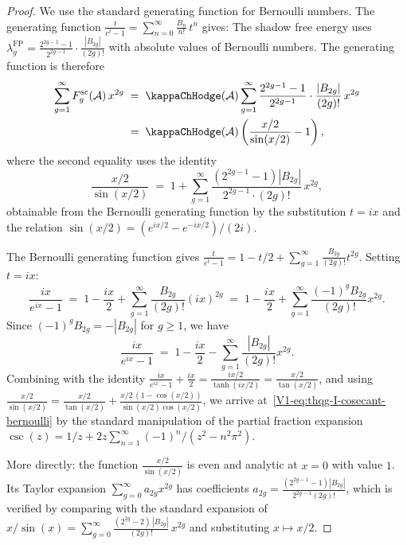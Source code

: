 \begin{proof}
We use the standard generating function for Bernoulli numbers. The generating function $\frac{t}{e^t - 1} = \sum_{n=0}^{\infty} \frac{B_n}{n!}\,t^n$ gives: The shadow free energy uses $\lambda_g^{\mathrm{FP}} = \frac{2^{2g-1}-1}{2^{2g-1}}\cdot\frac{|B_{2g}|}{(2g)!}$ with absolute values of Bernoulli numbers. The generating function is therefore
\begin{align}
\sum_{g=1}^{\infty} F_g^{\mathrm{sc}}(\cA)\,x^{2g} &\;=\; \kappaChHodge(\cA) \sum_{g=1}^{\infty} \frac{2^{2g-1}-1}{2^{2g-1}} \cdot \frac{|B_{2g}|}{(2g)!}\,x^{2g} \notag\\
&\;=\; \kappaChHodge(\cA) \left( \frac{x/2}{\sin(x/2)} - 1 \right), %
\end{align}
where the second equality uses the identity
\begin{equation}%
\frac{x/2}{\sin(x/2)} \;=\; 1 + \sum_{g=1}^{\infty} \frac{(2^{2g-1}-1)|B_{2g}|}{2^{2g-1}\cdot(2g)!}\,x^{2g},
\end{equation}
obtainable from the Bernoulli generating function by the substitution $t = ix$ and the relation $\sin(x/2) = (e^{ix/2} - e^{-ix/2})/(2i)$.

The Bernoulli generating function gives $\frac{t}{e^t - 1} = 1 - t/2 + \sum_{g=1}^\infty \frac{B_{2g}}{(2g)!} t^{2g}$. Setting $t = ix$:
\[
\frac{ix}{e^{ix} - 1} \;=\; 1 - \frac{ix}{2} + \sum_{g=1}^\infty \frac{B_{2g}}{(2g)!}(ix)^{2g} \;=\; 1 - \frac{ix}{2} + \sum_{g=1}^\infty \frac{(-1)^g B_{2g}}{(2g)!} x^{2g}.
\]
Since $(-1)^g B_{2g} = -|B_{2g}|$ for $g \geq 1$, we have
\[
\frac{ix}{e^{ix}-1} \;=\; 1 - \frac{ix}{2} - \sum_{g=1}^\infty \frac{|B_{2g}|}{(2g)!}x^{2g}.
\]
Combining with the identity $\frac{ix}{e^{ix}-1} + \frac{ix}{2} = \frac{ix/2}{\tanh(ix/2)} = \frac{x/2}{\tan(x/2)}$, and using $\frac{x/2}{\sin(x/2)} = \frac{x/2}{\tan(x/2)} + \frac{x/2\,(1-\cos(x/2))}{\sin(x/2)\cos(x/2)}$, we arrive at~\eqref{V1-eq:thqg-I-cosecant-bernoulli} by the standard manipulation of the partial fraction expansion $\csc(z) = 1/z + 2z\sum_{n=1}^\infty (-1)^n/(z^2 - n^2\pi^2)$.

More directly: the function $\frac{x/2}{\sin(x/2)}$ is even and analytic at $x = 0$ with value $1$. Its Taylor expansion $\sum_{g=0}^\infty a_{2g} x^{2g}$ has coefficients $a_{2g} = \frac{(2^{2g-1}-1)|B_{2g}|}{2^{2g-1}(2g)!}$, which is verified by comparing with the standard expansion of $x/\sin(x) = \sum_{g=0}^\infty \frac{(2^{2g}-2)\,|B_{2g}|}{(2g)!}\, x^{2g}$ and substituting $x \mapsto x/2$.
\end{proof}

